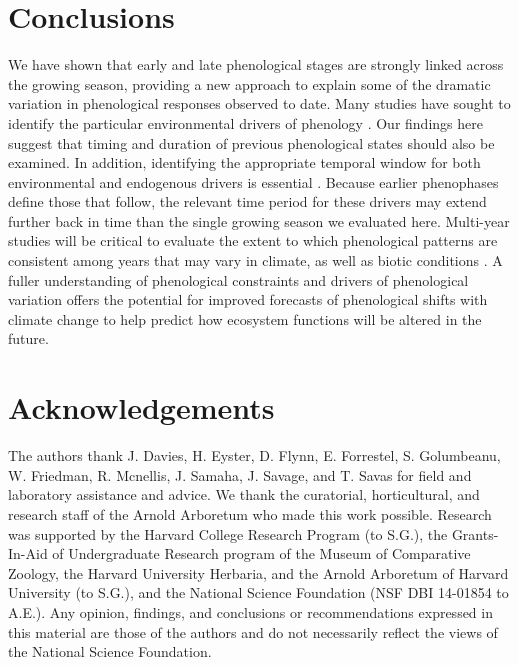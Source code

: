 \documentclass{article}
\begin{document}
\section* {Conclusions}
We have shown that early and late phenological stages are strongly linked across the growing season, providing a new approach to explain some of the dramatic variation in phenological responses observed to date. Many studies have sought to identify the particular environmental drivers of phenology \citep [e.g.,][]{morin2010,schwartz2013}. Our findings here suggest that timing and duration of previous phenological states should also be examined. In addition, identifying the appropriate temporal window for both environmental and endogenous drivers is essential \citep{teller2016}. Because earlier phenophases define those that follow, the relevant time period for these drivers may extend further back in time than the single growing season we evaluated here. Multi-year studies will be critical to evaluate the extent to which phenological patterns are consistent among years that may vary in climate, as well as biotic conditions \citep [i.e., pollinator or pest populations,][]{lechowicz1995}. %
A fuller understanding of phenological constraints and drivers of phenological variation offers the potential for improved forecasts of phenological shifts with climate change to help predict how ecosystem functions will be altered in the future. 

\section*{Acknowledgements}
The authors thank J. Davies, H. Eyster, D. Flynn, E. Forrestel, S. Golumbeanu, W. Friedman, R. Mcnellis, J. Samaha, J. Savage, and T. Savas for field and laboratory assistance and advice. We thank the curatorial, horticultural, and research staff of the Arnold Arboretum who made this work possible. Research was supported by the Harvard College Research Program (to S.G.), the Grants-In-Aid of Undergraduate Research program of the Museum of Comparative Zoology, the Harvard University Herbaria, and the Arnold Arboretum of Harvard University (to S.G.), and the National Science Foundation (NSF DBI 14-01854 to A.E.). Any opinion, findings, and conclusions or recommendations expressed in this material are those of the authors and do not necessarily reflect the views of the National Science Foundation.
\end{document}
